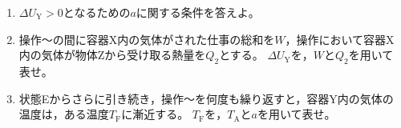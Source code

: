 \documentclass[b5paper, papersize, fleqn, 11pt, dvipdfmx, bold, nodots]{jsarticle}
\begin{document}
\begin{enumerate}[label=\Roman*, itemindent=1zw]
\begin{enumerate}[label=\Kakko*]
    \item $\varDelta U_\text{Y}>0$となるための$a$に関する条件を答えよ。

    \item 操作〜の間に容器X内の気体がされた仕事の総和を$W$，操作において容器X内の気体が物体Zから受け取る熱量を$Q_2$とする。
    $\varDelta U_\text{Y}$を，$W$と$Q_2$を用いて表せ。

    \item 状態Eからさらに引き続き，操作〜を何度も繰り返すと，容器Y内の気体の温度は，ある温度$T_\text{F}$に漸近する。
    $T_\text{F}$を，$T_\text{A}$と$a$を用いて表せ。
  \end{enumerate}
\end{enumerate}

\newpage
\end{document}
